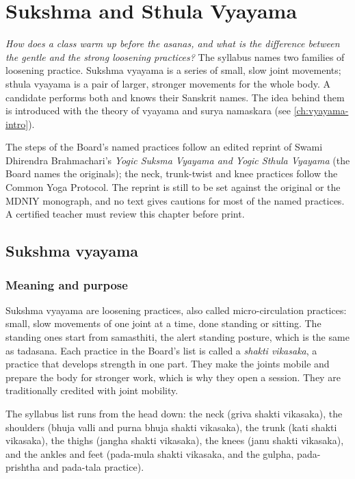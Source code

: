 \chapter{Sukshma and Sthula Vyayama}
\label{ch:vyayama}

\emph{How does a class warm up before the asanas, and what is the difference between the gentle and the strong loosening practices?}
The syllabus names two families of loosening practice. Sukshma vyayama is a series of small, slow joint movements; sthula vyayama is a pair of larger, stronger movements for the whole body. A candidate performs both and knows their Sanskrit names. The idea behind them is introduced with the theory of vyayama and surya namaskara (see \cref{ch:vyayama-intro}).

\begin{unverified}
The steps of the Board's named practices follow an edited reprint of Swami Dhirendra Brahmachari's \emph{Yogic Suksma Vyayama and Yogic Sthula Vyayama} (the Board names the originals); the neck, trunk-twist and knee practices follow the Common Yoga Protocol. The reprint is still to be set against the original or the MDNIY monograph, and no text gives cautions for most of the named practices. A certified teacher must review this chapter before print.
\end{unverified}

\section{Sukshma vyayama}

\subsection*{Meaning and purpose}
Sukshma vyayama are loosening practices, also called micro-circulation practices: small, slow movements of one joint at a time, done standing or sitting. The standing ones start from samasthiti, the alert standing posture, which is the same as tadasana. Each practice in the Board's list is called a \emph{shakti vikasaka}, a practice that develops strength in one part. They make the joints mobile and prepare the body for stronger work, which is why they open a session. They are traditionally credited with joint mobility.

The syllabus list runs from the head down: the neck (griva shakti vikasaka), the shoulders (bhuja valli and purna bhuja shakti vikasaka), the trunk (kati shakti vikasaka), the thighs (jangha shakti vikasaka), the knees (janu shakti vikasaka), and the ankles and feet (pada-mula shakti vikasaka, and the gulpha, pada-prishtha and pada-tala practice).

